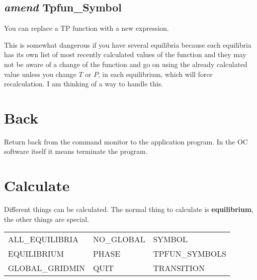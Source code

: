 \documentclass[12pt]{article}
\begin{document}
\subsection{{\em amend} Tpfun\_Symbol}

You can replace a TP function with a new expression.

This is somewhat dangerous if you have several equilibria because each
equilibria has its own list of most recently calculated values of the
function and they may not be aware of a change of the function and go
on using the already calculated value unless you change $T$ or $P$, in
each equilibrium, which will force recalculation.  I am thinking of a
way to handle this.

\section{Back }

Return back from the command monitor to the application program.  In
the OC software itself it means terminate the program.

\section{Calculate }

Different things can be calculated.  The normal thing to calculate is
{\bf equilibrium}, the other things are special.

\begin{tabular}{lll}
 ALL\_EQUILIBRIA &  NO\_GLOBAL &      SYMBOL\\
 EQUILIBRIUM     &  PHASE      &      TPFUN\_SYMBOLS\\
 GLOBAL\_GRIDMIN & QUIT        &     TRANSITION\\
\end{tabular}
\end{document}
